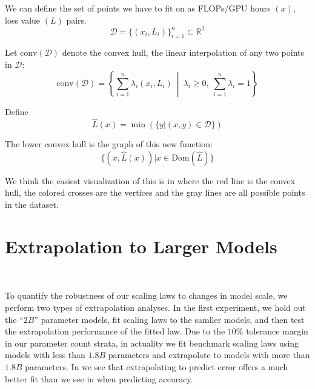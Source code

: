 \documentclass{article}
\begin{document}
We can define the set of points we have to fit on as FLOPs/GPU hours \((x)\), loss value \((L)\) pairs.
\[
\mathcal{D} = \{ (x_i, L_i) \}_{i=1}^n \subset \mathbb{R}^2
\]

Let \( \text{conv}(\mathcal{D}) \) denote the convex hull, the linear interpolation of any two points in \(\mathcal{D}\):
\[
\text{conv}(\mathcal{D}) = \left\{ \sum_{i=1}^{n} \lambda_i (x_i, L_i) \ \middle|\ \lambda_i \geq 0,\ \sum_{i=1}^{n} \lambda_i = 1 \right\}
\]

Define
\[
\hat{L}(x) = \min(\{y | (x,y) \in \mathcal{D}\})
\]

The lower convex hull is the graph of this new function:
\[
    \{(x, \hat{L}(x)) | x \in \text{Dom}(\hat{L})\}
\]

We think the easiest visualization of this is in  where the red line is the convex hull, the colored crosses are the vertices and the gray lines are all possible points in the dataset.

\section{Extrapolation to Larger Models}~\label{sec-app:extrap}

To quantify the robustness of our scaling laws to changes in model scale, we perform two types of extrapolation analyses. In the first experiment, we hold out the ``$2B$'' parameter models, fit scaling laws to the samller models, and then test the extrapolation performance of the fitted law. Due to the $10\%$ tolerance margin in our parameter count strata, in actuality we fit benchmark scaling laws using models with less than $1.8B$ parameters and extrapolate to models with more than $1.8B$ parameters.
In  we see that extrapolating to predict error offers a much better fit than we see in  when predicting accuracy.
\end{document}
